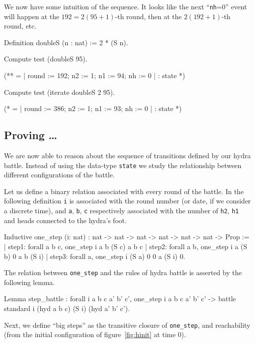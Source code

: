 \documentclass[a4paper]{book}
\begin{document}
We now have some intuition of the sequence.
It looks like the next ``\texttt{nh}=0'' event will happen at the $192=2(95+1)$-th round, then at the $2(192+1)$-th round, etc.


\begin{Coqsrc}
 Definition doubleS (n : nat) := 2 * (S n).

Compute test (doubleS 95).

(**
 = {| round := 192; n2 := 1; n1 := 94; nh := 0 |}
     : state
 *)


Compute test (iterate doubleS 2 95).

(*
  = {| round := 386; n2 := 1; n1 := 93; nh := 0 |}
     : state
*)
\end{Coqsrc}

\subsection{Proving \dots}
We are now able to reason about the sequence of transitions defined by our hydra battle. Instead of using the data-type \texttt{state} we study the relationship
between different configurations of the battle.

Let us define a binary relation associated with every round of the battle.
In the following definition \texttt{i} is associated with the round number (or date, if we consider a discrete time), and \texttt{a}, \texttt{b}, \texttt{c} respectively associated with the number of \texttt{h2}, \texttt{h1} and heads connected to the hydra's foot.

\begin{Coqsrc}
Inductive one_step (i: nat) :
  nat -> nat -> nat -> nat -> nat -> nat -> Prop :=
| step1: forall a b c, one_step i a b (S c) a b c
| step2:  forall a b, one_step i a (S b) 0 a b (S i)
| step3: forall a, one_step i (S a) 0 0 a (S i) 0.
\end{Coqsrc}

The relation between \texttt{one\_step} and the rules of hydra battle is asserted by the following lemma. 

\label{lemma:step-battle}

\begin{Coqsrc}
Lemma step_battle : forall i a b c a' b' c', 
   one_step i a b c a' b' c' ->
   battle standard i (hyd  a b c)  (S i) (hyd a' b' c').
\end{Coqsrc}

Next, we define ``big steps'' as the transitive closure of \texttt{one\_step},
and reachability (from the initial configuration of figure~\ref{fig:hinit} at time $0$).
\end{document}
